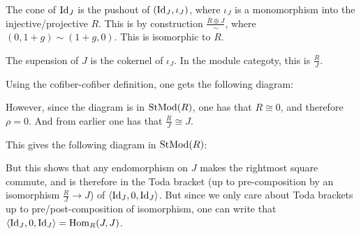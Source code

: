 The cone of \( \operatorname{Id}_J \) is the pushout of \( (\operatorname{Id}_J, \iota_J) \), where \( \iota_J \) is a monomorphism into the injective/projective \( R \). This is by construction \( \frac{R \oplus J}{\sim} \), where \( (0, 1+g) \sim (1+g, 0) \). This is isomorphic to \( R \).

The supension of \( J \) is the cokernel of \( \iota_J \). In the module categoty, this is \( \frac{R}{J} \).

Using the cofiber-cofiber definition, one gets the following diagram:

\begin{center}
\end{center}

However, since the diagram is in \( \operatorname{StMod}(R) \), one has that \( R \cong 0 \), and therefore \( \rho = 0 \). And from earlier one has that \( \frac{R}{J} \cong J \).

This gives the following diagram in \( \operatorname{StMod}(R) \):

\begin{center}
\end{center}

But this shows that any endomorphism on \( J \) makes the rightmost square commute, and is therefore in the Toda bracket (up to pre-composition by an isomorphism \( \frac{R}{J} \to J \)) of \( \langle \operatorname{Id}_J, 0, \operatorname{Id}_J \rangle \). But since we only care about Toda brackets up to pre/post-composition of isomorphism, one can write that \( \langle \operatorname{Id}_J, 0, \operatorname{Id}_J \rangle = \operatorname{Hom}_R(J, J) \).

